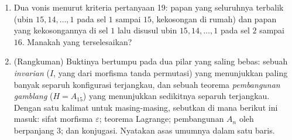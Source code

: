 \begin{problem}
\begin{enumerate}[resume]
        beranggotakan $n \geq 4$ sel yang mengusung $n - 1$ ubin.
        Tunjukkan bahwa urutan siklis ubinnya tidak berubah, bahwa tiap
        kelas keterjangkauan punya tepat $n(n - 1)$ konfigurasi
        \emph{(kelasnya adalah orbit  berorde
        $\operatorname{lcm}(n, n-1) = n(n-1)$)}, dan bahwa kelasnya ada
        $(n - 2)!$ --- untuk $n \geq 5$ jauh lebih banyak daripada
        $2$: pada papan yang tipis invarian paritas nyaris tak
        menangkap apa pun, dan geometrilah yang berkuasa.
  \item Dua vonis menurut kriteria pertanyaan 19: papan yang
        seluruhnya terbalik (ubin $15, 14, \dots, 1$ pada sel $1$
        sampai $15$, kekosongan di rumah) dan papan yang kekosongannya
        di sel $1$ lalu disusul ubin $15, 14, \dots, 1$ pada sel $2$
        sampai $16$. Manakah yang terselesaikan?
  \item (Rangkuman) Buktinya bertumpu pada dua pilar yang saling bebas:
        sebuah \emph{invarian} ($I$, yang  dari morfisma tanda
        permutasi) yang menunjukkan paling banyak separuh konfigurasi
        terjangkau, dan sebuah teorema \emph{pembangunan gamblang}
        ($H = A_{15}$) yang menunjukkan sedikitnya separuh terjangkau.
        Dengan satu kalimat untuk masing-masing, sebutkan di mana
        berikut ini masuk: sifat morfisma
        $\varepsilon$; teorema Lagrange; pembangunan $A_n$
        oleh  berpanjang $3$; dan konjugasi. Nyatakan asas
        umumnya dalam satu baris.

\end{enumerate}
\end{problem}
